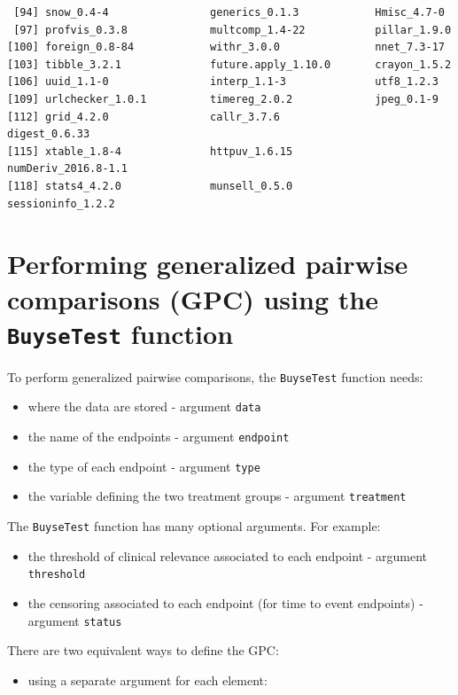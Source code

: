 \documentclass[12pt]{article}
\begin{document}
\begin{verbatim}
 [94] snow_0.4-4                generics_0.1.3            Hmisc_4.7-0              
 [97] profvis_0.3.8             multcomp_1.4-22           pillar_1.9.0             
[100] foreign_0.8-84            withr_3.0.0               nnet_7.3-17              
[103] tibble_3.2.1              future.apply_1.10.0       crayon_1.5.2             
[106] uuid_1.1-0                interp_1.1-3              utf8_1.2.3               
[109] urlchecker_1.0.1          timereg_2.0.2             jpeg_0.1-9               
[112] grid_4.2.0                callr_3.7.6               digest_0.6.33            
[115] xtable_1.8-4              httpuv_1.6.15             numDeriv_2016.8-1.1      
[118] stats4_4.2.0              munsell_0.5.0             sessioninfo_1.2.2
\end{verbatim}

\clearpage

\section{Performing generalized pairwise comparisons (GPC) using the \texttt{BuyseTest} function}
\label{sec:orgcfe01de}

To perform generalized pairwise comparisons, the \texttt{BuyseTest} function needs:
\begin{itemize}
\item where the data are stored \hfill - argument \texttt{data}
\item the name of the endpoints \hfill - argument \texttt{endpoint}
\item the type of each endpoint \hfill - argument \texttt{type}
\item the variable defining the two treatment groups \hfill - argument
\texttt{treatment}
\end{itemize}
The \texttt{BuyseTest} function has many optional arguments. For example:
\begin{itemize}
\item the threshold of clinical relevance associated to each endpoint \hfill - argument \texttt{threshold}
\item the censoring associated to each endpoint (for time to event endpoints) \hfill - argument \texttt{status}
\end{itemize}

\bigskip

There are two equivalent ways to define the GPC: 
\begin{itemize}
\item using a separate argument for each element:
\end{itemize}
\end{document}
